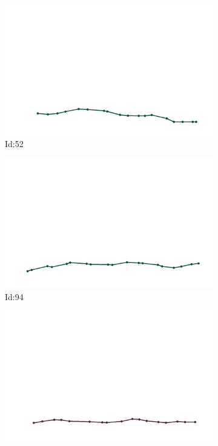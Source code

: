 \documentclass[12pt,twoside]{report}
\begin{document}
\begin{figure}
\centering
\begin{subfigure}[b]{0.20\textwidth}
\centering
\includegraphics[width=\textwidth]{../../trajectories/52.png}
\caption{Id:52}
\end{subfigure}
\begin{subfigure}[b]{0.20\textwidth}
\centering
\includegraphics[width=\textwidth]{../../trajectories/94.png}
\caption{Id:94}
\end{subfigure}
\begin{subfigure}[b]{0.20\textwidth}
\centering
\includegraphics[width=\textwidth]{../../trajectories/232.png}

\end{subfigure}
\end{figure}
\end{document}
